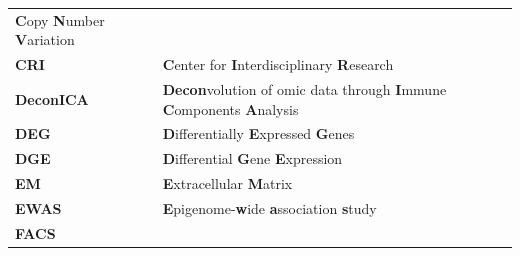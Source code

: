 \documentclass[12pt,]{book}
\theoremstyle{definition}
\theoremstyle{definition}
\theoremstyle{definition}
\theoremstyle{remark}
\begin{document}
\begin{longtable}[]{@{}ll@{}}
\begin{minipage}[t]{0.81\columnwidth}
\textbf{C}opy \textbf{N}umber \textbf{V}ariation\strut
\end{minipage}\tabularnewline
\begin{minipage}[t]{0.13\columnwidth}\raggedright
\textbf{CRI}\strut
\end{minipage} & \begin{minipage}[t]{0.81\columnwidth}\raggedright
\textbf{C}enter for \textbf{I}nterdisciplinary \textbf{R}esearch\strut
\end{minipage}\tabularnewline
\begin{minipage}[t]{0.13\columnwidth}\raggedright
\textbf{DeconICA}\strut
\end{minipage} & \begin{minipage}[t]{0.81\columnwidth}\raggedright
\textbf{Decon}volution of omic data through \textbf{I}mmune
\textbf{C}omponents \textbf{A}nalysis\strut
\end{minipage}\tabularnewline
\begin{minipage}[t]{0.13\columnwidth}\raggedright
\textbf{DEG}\strut
\end{minipage} & \begin{minipage}[t]{0.81\columnwidth}\raggedright
\textbf{D}ifferentially \textbf{E}xpressed \textbf{G}enes\strut
\end{minipage}\tabularnewline
\begin{minipage}[t]{0.13\columnwidth}\raggedright
\textbf{DGE}\strut
\end{minipage} & \begin{minipage}[t]{0.81\columnwidth}\raggedright
\textbf{D}ifferential \textbf{G}ene \textbf{E}xpression\strut
\end{minipage}\tabularnewline
\begin{minipage}[t]{0.13\columnwidth}\raggedright
\textbf{EM}\strut
\end{minipage} & \begin{minipage}[t]{0.81\columnwidth}\raggedright
\textbf{E}xtracellular \textbf{M}atrix\strut
\end{minipage}\tabularnewline
\begin{minipage}[t]{0.13\columnwidth}\raggedright
\textbf{EWAS}\strut
\end{minipage} & \begin{minipage}[t]{0.81\columnwidth}\raggedright
\textbf{E}pigenome-\textbf{w}ide \textbf{a}ssociation
\textbf{s}tudy\strut
\end{minipage}\tabularnewline
\begin{minipage}[t]{0.13\columnwidth}\raggedright
\textbf{FACS}\strut

\end{minipage}
\end{longtable}
\end{document}
